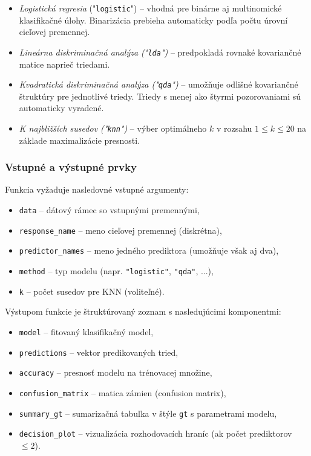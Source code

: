 \begin{itemize}
\setlength{\itemsep}{0pt}
  \setlength{\parskip}{0pt}
  \item \textit{Logistická regresia} ("\texttt{logistic}") – vhodná pre binárne aj multinomické klasifikačné úlohy. Binarizácia prebieha automaticky podľa počtu úrovní cieľovej premennej.
  \item \textit{Lineárna diskriminačná analýza ("\texttt{lda}")} – predpokladá rovnaké kovariančné matice naprieč triedami.
  \item \textit{Kvadratická diskriminačná analýza ("\texttt{qda}")} – umožňuje odlišné kovariančné štruktúry pre jednotlivé triedy. Triedy s menej ako štyrmi pozorovaniami sú automaticky vyradené.
  \item \textit{K najbližších susedov ("\texttt{knn}")} – výber optimálneho $k$ v rozsahu $1 \leq k \leq 20$ na základe maximalizácie presnosti.
\end{itemize}

\subsubsection{Vstupné a výstupné prvky}

Funkcia vyžaduje nasledovné vstupné argumenty:

\begin{itemize}
\setlength{\itemsep}{0pt}
  \setlength{\parskip}{0pt}
  \item \texttt{data} – dátový rámec so vstupnými premennými,
  \item \texttt{response\_name} – meno cieľovej premennej (diskrétna),
  \item \texttt{predictor\_names} – meno jedného prediktora (umožňuje však aj dva),
  \item \texttt{method} – typ modelu (napr. \texttt{"logistic"}, \texttt{"qda"}, ...),
  \item \texttt{k} – počet susedov pre KNN (voliteľné).
\end{itemize}

Výstupom funkcie je štruktúrovaný zoznam s nasledujúcimi komponentmi:

\begin{itemize}
\setlength{\itemsep}{0pt}
  \setlength{\parskip}{0pt}
  \item \texttt{model} – fitovaný klasifikačný model,
  \item \texttt{predictions} – vektor predikovaných tried,
  \item \texttt{accuracy} – presnosť modelu na trénovacej množine,
  \item \texttt{confusion\_matrix} – matica zámien (confusion matrix),
  \item \texttt{summary\_gt} – sumarizačná tabuľka v štýle \texttt{gt} s parametrami modelu,
  \item \texttt{decision\_plot} – vizualizácia rozhodovacích hraníc (ak počet prediktorov $\leq 2$).
\end{itemize}

